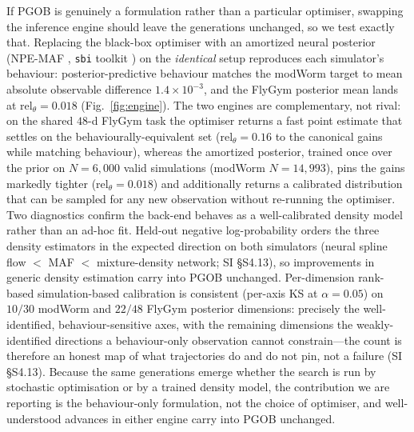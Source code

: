 \documentclass[11pt]{article}
\begin{document}
If PGOB is genuinely a formulation rather than a particular optimiser, swapping the inference engine should leave the generations unchanged, so we test exactly that. Replacing the black-box optimiser with an amortized neural posterior (NPE-MAF \citep{papamakarios2017maf}, \texttt{sbi} toolkit \citep{tejero2020sbi}) on the \emph{identical} setup reproduces each simulator's behaviour: posterior-predictive behaviour matches the modWorm target to mean absolute observable difference $1.4{\times}10^{-3}$, and the FlyGym posterior mean lands at $\mathrm{rel}_\theta{=}0.018$ (Fig.~\ref{fig:engine}). The two engines are complementary, not rival: on the shared $48$-d FlyGym task the optimiser returns a fast point estimate that settles on the behaviourally-equivalent set ($\mathrm{rel}_\theta{=}0.16$ to the canonical gains while matching behaviour), whereas the amortized posterior, trained once over the prior on $N{=}6{,}000$ valid simulations (modWorm $N{=}14{,}993$), pins the gains markedly tighter ($\mathrm{rel}_\theta{=}0.018$) and additionally returns a calibrated distribution that can be sampled for any new observation without re-running the optimiser. Two diagnostics confirm the back-end behaves as a well-calibrated density model rather than an ad-hoc fit. Held-out negative log-probability orders the three density estimators in the expected direction on both simulators (neural spline flow $<$ MAF $<$ mixture-density network; SI \S S4.13), so improvements in generic density estimation carry into PGOB unchanged. Per-dimension rank-based simulation-based calibration is consistent (per-axis KS at $\alpha{=}0.05$) on $10/30$ modWorm and $22/48$ FlyGym posterior dimensions: precisely the well-identified, behaviour-sensitive axes, with the remaining dimensions the weakly-identified directions a behaviour-only observation cannot constrain---the count is therefore an honest map of what trajectories do and do not pin, not a failure (SI \S S4.13). Because the same generations emerge whether the search is run by stochastic optimisation or by a trained density model, the contribution we are reporting is the behaviour-only formulation, not the choice of optimiser, and well-understood advances in either engine carry into PGOB unchanged.
\end{document}
